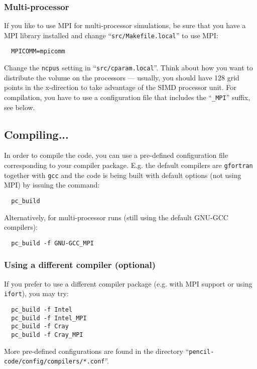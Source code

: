 \documentclass[a4paper,12pt]{article}
\newcommand{\command}[1]{\texttt{#1}}
\newcommand{\file}[1]{``\texttt{#1}''}
\newcommand{\name}[1]{\textsc{#1}}
\newcommand{\code}[1]{\texttt{#1}}
\begin{document}
\subsubsection{Multi-processor}
If you like to use \name{MPI} for multi-processor simulations, be sure that you have a \name{MPI} library installed and change \file{src/Makefile.local} to use \name{MPI}:
\begin{verbatim}
  MPICOMM=mpicomm
\end{verbatim}

Change the \code{ncpus} setting in \file{src/cparam.local}.
Think about how you want to distribute the volume on the processors --- usually, you should have 128 grid points in the x-direction to take advantage of the SIMD processor unit.
For compilation, you have to use a configuration file that includes the \file{\_MPI} suffix, see below.

\subsection{Compiling...}

In order to compile the code, you can use a pre-defined configuration file corresponding to your compiler package.
E.g. the default compilers are \command{gfortran} together with \command{gcc} and the code is being built with default options (not using \name{MPI}) by issuing the command:

\begin{verbatim}
  pc_build
\end{verbatim}

Alternatively, for multi-processor runs (still using the default \name{GNU-GCC} compilers):
\begin{verbatim}
  pc_build -f GNU-GCC_MPI
\end{verbatim}

\subsubsection{Using a different compiler (optional)}

If you prefer to use a different compiler package (e.g. with \name{MPI} support or using \command{ifort}), you may try:

\begin{verbatim}
  pc_build -f Intel
  pc_build -f Intel_MPI
  pc_build -f Cray
  pc_build -f Cray_MPI
\end{verbatim}

More pre-defined configurations are found in the directory \file{pencil-code/config/compilers/*.conf}.
\end{document}
